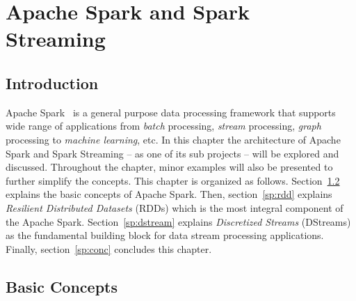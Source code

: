 \chapter{Apache Spark and Spark Streaming}
\label{spark}

\section{Introduction}
\label{sp:intro}

Apache Spark~\cite{spark} is a general purpose data processing framework that supports wide range of applications from \emph{batch} processing, \emph{stream} processing, \emph{graph} processing to \emph{machine learning}, etc. In this chapter the architecture of Apache Spark and Spark Streaming -- as one of its sub projects -- will be explored and discussed. Throughout the chapter, minor examples will also be presented to further simplify the concepts. This chapter is organized as follows. Section~\ref{sp:basics} explains the basic concepts of Apache Spark. Then, section~\ref{sp:rdd} explains \emph{Resilient Distributed Datasets} (RDDs) which is the most integral component of the Apache Spark. Section~\ref{sp:dstream} explains \emph{Discretized Streams} (DStreams) as the fundamental building block for data stream processing applications. Finally, section~\ref{sp:conc} concludes this chapter.

\section{Basic Concepts}
\label{sp:basics}

